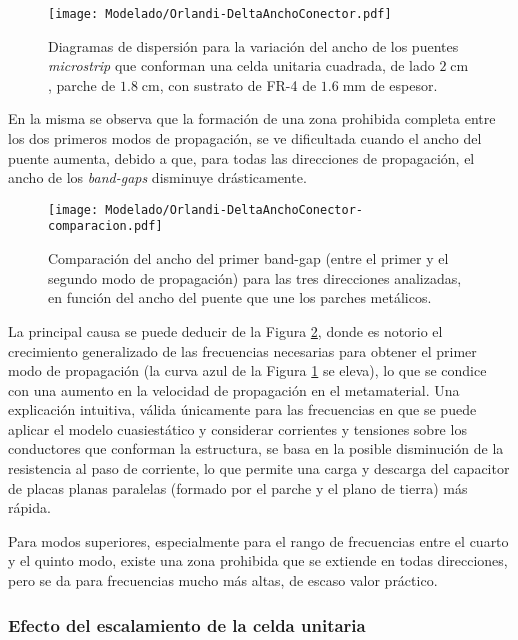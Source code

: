 \begin{figure}[h]
	\centering
	\texttt{[image: Modelado/Orlandi-DeltaAnchoConector.pdf]}
	\caption{Diagramas de dispersión para la variación del ancho de los puentes \textit{microstrip} que conforman una celda unitaria cuadrada, de lado $2\;\text{cm}$, parche de $1.8\;\text{cm}$, con sustrato de FR-4 de $1.6\;\text{mm}$ de espesor.}
	\label{fig:diagdisp-orlandi-variacion-ancho-puente}
\end{figure}

En la misma se observa que la formación de una zona prohibida completa entre los dos primeros modos de propagación, se ve dificultada cuando el ancho del puente aumenta, debido a que, para todas las direcciones de propagación, el ancho de los \textit{band-gaps} disminuye drásticamente.


\begin{figure}[h]
	\centering
	\texttt{[image: Modelado/Orlandi-DeltaAnchoConector-comparacion.pdf]}
	\caption{Comparación del ancho del primer band-gap (entre el primer y el segundo modo de propagación) para las tres direcciones analizadas, en función del ancho del puente que une los parches metálicos.}
	\label{fig:comparacion-diagdisp-orlandi-variacion-ancho-puente}
\end{figure}

La principal causa se puede deducir de la Figura \ref{fig:comparacion-diagdisp-orlandi-variacion-ancho-puente}, donde es notorio el crecimiento generalizado de las frecuencias necesarias para obtener el primer modo de propagación (la curva azul de la Figura \ref{fig:diagdisp-orlandi-variacion-ancho-puente} se eleva), lo que se condice con una aumento en la velocidad de propagación en el metamaterial. Una explicación intuitiva, válida únicamente para las frecuencias en que se puede aplicar el modelo cuasiestático y considerar corrientes y tensiones sobre los conductores que conforman la estructura, se basa en la posible disminución de la resistencia al paso de corriente, lo que permite una carga y descarga del capacitor de placas planas paralelas (formado por el parche y el plano de tierra) más rápida.

Para modos superiores, especialmente para el rango de frecuencias entre el cuarto y el quinto modo, existe una zona prohibida que se extiende en todas direcciones, pero se da para frecuencias mucho más altas, de escaso valor práctico.

\clearpage
\subsubsection{Efecto del escalamiento de la celda unitaria}

